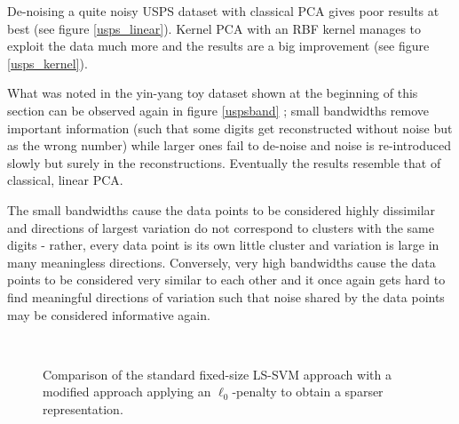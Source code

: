 
De-noising a quite noisy USPS dataset with classical PCA gives poor results at best (see figure \ref{usps_linear}). Kernel PCA with an RBF kernel manages to exploit the data much more and the results are a big improvement (see figure \ref{usps_kernel}).

What was noted in the yin-yang toy dataset shown at the beginning of this section can be observed again in figure \ref{uspsband} ; small bandwidths remove important information (such that some digits get reconstructed without noise but as the wrong number) while larger ones fail to de-noise and noise is re-introduced slowly but surely in the reconstructions. Eventually the results resemble that of classical, linear PCA.

\par The small bandwidths cause the data points to be considered highly dissimilar and directions of largest variation do not correspond to clusters with the same digits - rather, every data point is its own little cluster and variation is large in many meaningless directions. Conversely, very high bandwidths cause the data points to be considered very similar to each other and it once again gets hard to find meaningful directions of variation such that noise shared by the data points may be considered informative again.

\endgroup

\begin{figure}[h]
\centering
%
\quad
{}\quad
{}\\
%
\caption{Comparison of the standard fixed-size LS-SVM approach with a modified approach applying an $\ell_0$-penalty to obtain a sparser representation.}
\label{fscomp}
\end{figure}

